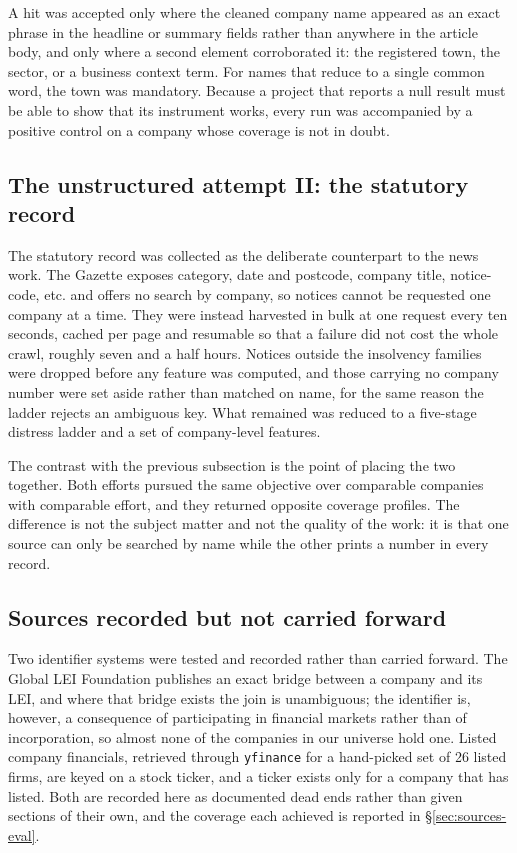 \documentclass[    author={Samuel Menon Demelo; Sneha Saphala Ram Prasad; 
Viktor Ander Lindholm; Vishal Khatri},
               supervisor={Prof. Fernando Moreno-Pino},
                   degree={MSc},
                    title={Lloyds Commercial Banking Intelligence},
                 subtitle={Ranking SME Lending, Risk and Growth Prospects for Lloyds Banking Group},
                     type={},
                     year={2026}]{dissertation}
\begin{document}
A hit was accepted only where the cleaned company name appeared as an exact phrase in the headline or summary fields rather than anywhere in the article body, and only where a second element corroborated it: the registered town, the sector, or a business context term. For names that reduce to a single common word, the town was mandatory. Because a project that reports a null result must be able to show that its instrument works, every run was accompanied by a positive control on a company whose coverage is not in doubt.

\subsection{The unstructured attempt II: the statutory record}
The statutory record was collected as the deliberate counterpart to the news work. The Gazette exposes category, date and postcode, company title, notice-code, etc. and offers no search by company, so notices cannot be requested one company at a time. They were instead harvested in bulk at one request every ten seconds, cached per page and resumable so that a failure did not cost the whole crawl, roughly seven and a half hours. Notices outside the insolvency families were dropped before any feature was computed, and those carrying no company number were set aside rather than matched on name, for the same reason the ladder rejects an ambiguous key. What remained was reduced to a five-stage distress ladder and a set of company-level features.

The contrast with the previous subsection is the point of placing the two together. Both efforts pursued the same objective over comparable companies with comparable effort, and they returned opposite coverage profiles. The difference is not the subject matter and not the quality of the work: it is that one source can only be searched by name while the other prints a number in every record.

\subsection{Sources recorded but not carried forward}
Two identifier systems were tested and recorded rather than carried forward. The Global LEI Foundation publishes an exact bridge between a company and its LEI, and where that bridge exists the join is unambiguous; the identifier is, however, a consequence of participating in financial markets rather than of incorporation, so almost none of the companies in our universe hold one. Listed company financials, retrieved through \texttt{yfinance} for a hand-picked set of 26 listed firms, are keyed on a stock ticker, and a ticker exists only for a company that has listed. Both are recorded here as documented dead ends rather than given sections of their own, and the coverage each achieved is reported in \S\ref{sec:sources-eval}.
\end{document}
